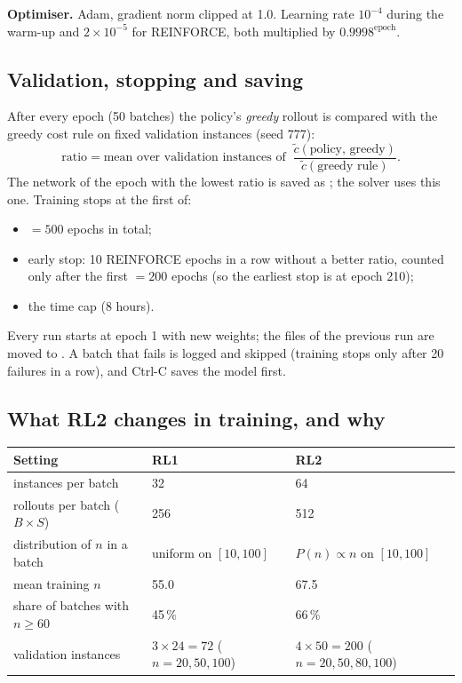 \textbf{Optimiser.} Adam, gradient norm clipped at 1.0. Learning rate $10^{-4}$ during the warm-up and $2\times10^{-5}$ for REINFORCE, both multiplied by $0.9998^{\text{epoch}}$.

\subsection{Validation, stopping and saving}

After every epoch (50 batches) the policy's \emph{greedy} rollout is compared with the greedy cost rule on fixed validation instances (seed 777):
\[
\text{ratio}=\text{mean over validation instances of }\ \frac{\tilde c(\text{policy, greedy})}{\tilde c(\text{greedy rule})}.
\]
The network of the epoch with the lowest ratio is saved as ; the solver uses this one. Training stops at the first of:
\begin{itemize}
  \item {} $=500$ epochs in total;
  \item early stop: 10 REINFORCE epochs in a row without a better ratio, counted only after the first  $=200$ epochs (so the earliest stop is at epoch 210);
  \item the time cap (8 hours).
\end{itemize}
Every run starts at epoch 1 with new weights; the files of the previous run are moved to . A batch that fails is logged and skipped (training stops only after 20 failures in a row), and Ctrl-C saves the model first.

\subsection{What RL2 changes in training, and why}

\begin{center}\small
\begin{tabular}{@{}lll@{}}
\toprule
\textbf{Setting} & \textbf{RL1} & \textbf{RL2} \\
\midrule
instances per batch & 32 & 64 \\
rollouts per batch ($B\times S$) & 256 & 512 \\
distribution of $n$ in a batch & uniform on $[10,100]$ & $P(n)\propto n$ on $[10,100]$ \\
mean training $n$ & 55.0 & 67.5 \\
share of batches with $n\ge60$ & 45\,\% & 66\,\% \\
validation instances & $3\times24=72$ ($n=20,50,100$) & $4\times50=200$ ($n=20,50,80,100$) \\
\bottomrule
\end{tabular}
\end{center}

